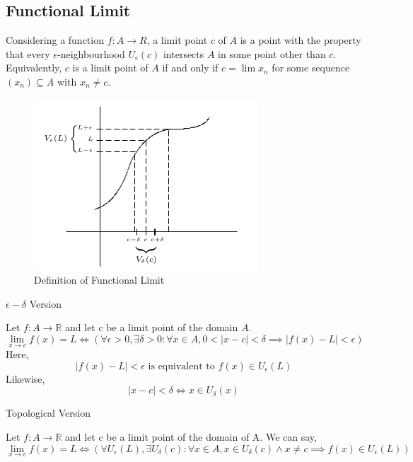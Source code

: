 \documentclass[12pt]{article}
\begin{document}

\subsection{Functional Limit}
Considering a function $f:A \to R$, a limit point $c$ of $A$ is a point with the property that every $\epsilon$-neighbourhood $U_\epsilon(c)$ intersects $A$ in some point other than $c$. Equivalently, $c$ is a limit point of $A$  if and only if $c=\lim x_n$ for some sequence $(x_n) \subseteq A$ with $x_n \neq c$. \\
\begin{figure}[htpb]
    \centering
    \includegraphics[scale=0.5]{Functional Limit Definition.png}
    \caption{\small Definition of Functional Limit}
\end{figure}

\begin{definition}{$\epsilon-\delta$ Version}

Let $f: A \to \mathbb{R}$ and let c be a limit point of the domain $A$. \[
    \lim_{x \to c} f(x) = L \iff (\forall \epsilon>0, \exists\delta>0 : \forall x \in A, 0 < |x-c| < \delta \implies |f(x)-L| < \epsilon)
\]
Here, \[
    |f(x)-L|<\epsilon \text{ is equivalent to } f(x) \in U_\epsilon(L)
\]
Likewise, \[
    |x-c|<\delta \iff x \in U_\delta(x)
\]
\end{definition}

\begin{definition}{Topological Version}

    Let $f : A \to \mathbb{R}$ and let c be a limit point of the domain of A. We can say, \[
        \lim_{x \to c} f(x)=L \iff ( \forall U_\epsilon(L), \exists U_\delta(c) : \forall x \in A, x \in U_\delta(c) \land x \neq c \implies f(x) \in U_\epsilon(L) )
    \] \\
\end{definition}
\end{document}

